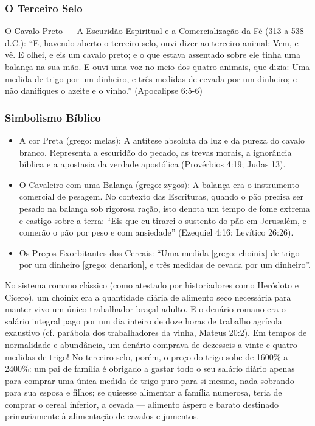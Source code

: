 \documentclass[11pt,a4paper,openany]{book}
\begin{document}
\subsubsection*{O Terceiro Selo}
O Cavalo Preto — A Escuridão Espiritual e a Comercialização da Fé (313 a 538 d.C.):
``E, havendo aberto o terceiro selo, ouvi dizer ao terceiro animal: Vem, e vê. E olhei, e eis um cavalo preto; e o que estava assentado sobre ele tinha uma balança na sua mão. E ouvi uma voz no meio dos quatro animais, que dizia: Uma medida de trigo por um dinheiro, e três medidas de cevada por um dinheiro; e não danifiques o azeite e o vinho.'' (Apocalipse 6:5-6)


\subsubsection*{Simbolismo Bíblico}
\begin{itemize}
  \item A cor Preta (grego: melas): A antítese absoluta da luz e da pureza do cavalo branco. Representa a escuridão do pecado, as trevas morais, a ignorância bíblica e a apostasia da verdade apostólica (Provérbios 4:19; Judas 13).
  \item O Cavaleiro com uma Balança (grego: zygos): A balança era o instrumento comercial de pesagem. No contexto das Escrituras, quando o pão precisa ser pesado na balança sob rigorosa ração, isto denota um tempo de fome extrema e castigo sobre a terra: ``Eis que eu tirarei o sustento do pão em Jerusalém, e comerão o pão por peso e com ansiedade'' (Ezequiel 4:16; Levítico 26:26).
  \item Os Preços Exorbitantes dos Cereais: ``Uma medida [grego: choinix] de trigo por um dinheiro [grego: denarion], e três medidas de cevada por um dinheiro''.
\end{itemize}

No sistema romano clássico (como atestado por historiadores como Heródoto e Cícero), um choinix era a quantidade diária de alimento seco necessária para manter vivo um único trabalhador braçal adulto. E o denário romano era o salário integral pago por um dia inteiro de doze horas de trabalho agrícola exaustivo (cf. parábola dos trabalhadores da vinha, Mateus 20:2). Em tempos de normalidade e abundância, um denário comprava de dezesseis a vinte e quatro medidas de trigo! No terceiro selo, porém, o preço do trigo sobe de 1600\% a 2400\%: um pai de família é obrigado a gastar todo o seu salário diário apenas para comprar uma única medida de trigo puro para si mesmo, nada sobrando para sua esposa e filhos; se quisesse alimentar a família numerosa, teria de comprar o cereal inferior, a cevada — alimento áspero e barato destinado primariamente à alimentação de cavalos e jumentos.
\end{document}
